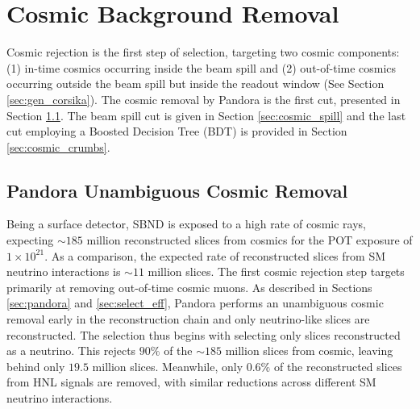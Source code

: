 

\section{Cosmic Background Removal}
\label{sec:cosmic_rej}

Cosmic rejection is the first step of selection, targeting two cosmic components: (1) in-time cosmics occurring inside the beam spill and (2) out-of-time cosmics occurring outside the beam spill but inside the readout window (See Section \ref{sec:gen_corsika}).  
The cosmic removal by Pandora is the first cut, presented in Section \ref{sec:cosmic_pandora}.
The beam spill cut is given in Section \ref{sec:cosmic_spill} and the last cut employing a Boosted Decision Tree (BDT) is provided in Section \ref{sec:cosmic_crumbs}.

\subsection{Pandora Unambiguous Cosmic Removal}
\label{sec:cosmic_pandora}

Being a surface detector, SBND is exposed to a high rate of cosmic rays, expecting $\sim 185$ million reconstructed slices from cosmics for the POT exposure of $1 \times 10^{21}$.
As a comparison, the expected rate of reconstructed slices from SM neutrino interactions is $\sim 11$ million slices.
The first cosmic rejection step targets primarily at removing out-of-time cosmic muons.
As described in Sections \ref{sec:pandora} and \ref{sec:select_eff}, Pandora performs an unambiguous cosmic removal early in the reconstruction chain and only neutrino-like slices are reconstructed. 
The selection thus begins with selecting only slices reconstructed as a neutrino.
This rejects $90 \%$ of the $\sim 185$ million slices from cosmic, leaving behind only $19.5$ million slices.
Meanwhile, only $0.6 \%$ of the reconstructed slices from HNL signals are removed, with similar reductions across different SM neutrino interactions.  


